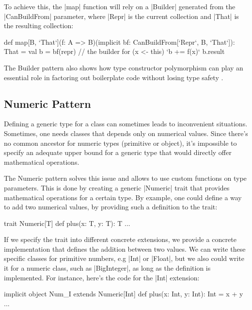 To achieve this, the |map| function will rely on a |Builder| generated from the |CanBuildFrom| parameter, where |Repr| is the current collection and |That| is the resulting collection:

\begin{lstlisting-nobreak}
  def map[B, `That`](f: A => B)(implicit bf: CanBuildFrom[`Repr`, B, `That`]): That = {
    val b = bf(repr) // the builder
    for (x <- this)
      `b += f(x)`
    b.result
  }
\end{lstlisting-nobreak}



The Builder pattern also shows how type constructor polymorphism can play an essential role in factoring out boilerplate code without losing type safety \cite{adriaan}.

\subsection{Numeric Pattern}

Defining a generic type for a class can sometimes leads to inconvenient situations. Sometimes, one needs classes that depends only on numerical values. Since there's no common ancestor for numeric types (primitive or object), it's impossible to specify an adequate upper bound for a generic type that would directly offer mathematical operations.

The Numeric pattern solves this issue and allows to use custom functions on type parameters. This is done by creating a generic |Numeric| trait that provides mathematical operations for a certain type. By example, one could define a way to add two numerical values, by providing such a definition to the trait:

\begin{lstlisting-nobreak}
 trait Numeric[T] {
   def plus(x: T, y: T): T
   ...
 }
\end{lstlisting-nobreak}

If we specify the trait into different concrete extensions, we provide a concrete implementation that defines the addition between two values. We can write these specific classes for primitive numbers, e.g |Int| or |Float|, but we also could write it for a numeric class, such as |BigInteger|, as long as the definition is implemented. For instance, here's the code for the |Int| extension:

\begin{lstlisting-nobreak}
 implicit object Num_I extends Numeric[Int] {
   def plus(x: Int, y: Int): Int = x + y
   ...
 }
\end{lstlisting-nobreak}

